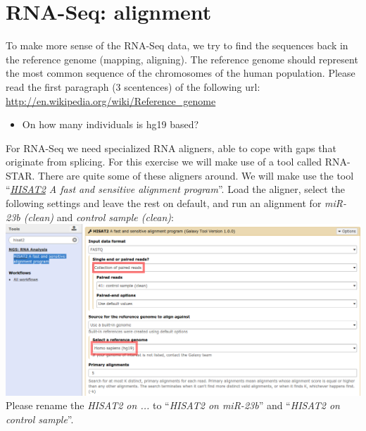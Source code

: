 \documentclass[11pt,a4paper]{article}
\begin{document}
\section{RNA-Seq: alignment}
To make more sense of the RNA-Seq data, we try to find the sequences back in the reference genome (mapping, aligning). The reference
genome should represent the most common sequence of the chromosomes of the human population. Please read the first paragraph (3 scentences) of the following url: \url{http://en.wikipedia.org/wiki/Reference_genome}
\begin{itemize}
	\item On how many individuals is hg19 based?
\end{itemize}
For RNA-Seq we need specialized RNA aligners, able to cope with gaps that originate from splicing. For this exercise we will make use of a tool called RNA-STAR. There are quite some of these aligners around. We will make use the tool ``\textit{\underline{HISAT2} A fast and sensitive alignment program}''. Load the aligner, select the following settings and leave the rest on default, and run an alignment for \textit{miR-23b (clean)} and \textit{control sample (clean)}:\\
\includegraphics[width=\textwidth]{figures/alignment_01.png}\\
Please rename the \textit{HISAT2 on ...} to ``\textit{HISAT2 on miR-23b}'' and ``\textit{HISAT2 on control sample}''.







%
%


\vspace{-1.5em}

\end{document}

